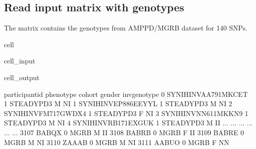 \documentclass[letterpaper,10pt,english]{jupyterBook}
\begin{document}
\subsection{Read input matrix with genotypes}
\label{\detokenize{Cooper:read-input-matrix-with-genotypes}}
\sphinxAtStartPar
The matrix contains the genotypes from AMP\sphinxhyphen{}PD/MGRB dataset for 140 SNPs.

\begin{sphinxuseclass}{cell}\begin{sphinxVerbatimInput}

\begin{sphinxuseclass}{cell_input}
\begin{sphinxVerbatim}[commandchars=\\\{\}]
   
\end{sphinxVerbatim}

\end{sphinxuseclass}\end{sphinxVerbatimInput}
\begin{sphinxVerbatimOutput}

\begin{sphinxuseclass}{cell_output}
\begin{sphinxVerbatim}[commandchars=\\\{\}]
            participant\PYGZus{}id  phenotype      cohort gender inv\PYGZus{}genotype  \PYGZbs{}
0     SY\PYGZhy{}NIH\PYGZus{}INVAA791MKCET          1  STEADY\PYGZhy{}PD3      M           NI   
1     SY\PYGZhy{}NIH\PYGZus{}INVEP886EEYYL          1  STEADY\PYGZhy{}PD3      M           NI   
2     SY\PYGZhy{}NIH\PYGZus{}INVFM717GWDX4          1  STEADY\PYGZhy{}PD3      F           NI   
3     SY\PYGZhy{}NIH\PYGZus{}INVNN611MKKN9          1  STEADY\PYGZhy{}PD3      M           NI   
4     SY\PYGZhy{}NIH\PYGZus{}INVRB171EXGUK          1  STEADY\PYGZhy{}PD3      M           II   
...                    ...        ...         ...    ...          ...   
3107                 BABQX          0        MGRB      M           II   
3108                 BABRB          0        MGRB      F           II   
3109                 BABRE          0        MGRB      M           NI   
3110                 ZAAAB          0        MGRB      M           NI   
3111                 AABUO          0        MGRB      F           NN   


\end{sphinxVerbatim}
\end{sphinxuseclass}
\end{sphinxVerbatimOutput}
\end{sphinxuseclass}
\end{document}
